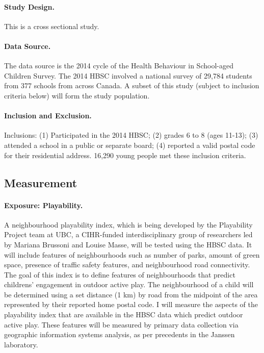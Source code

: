 \documentclass [11pt]{article}
\begin{document}
\paragraph{Study Design. }This is a cross sectional study. 

\paragraph{Data Source.} The data source is the 2014 cycle of the Health Behaviour in School-aged Children Survey. The 2014 HBSC involved a national survey of 29,784 students from 377 schools from across Canada. A subset of this study (subject to inclusion criteria below) will form the study population.  

\paragraph{Inclusion and Exclusion.} Inclusions:  (1) Participated in the 2014 HBSC; (2) grades 6 to 8 (ages 11-13); (3) attended a school in a public or separate board; (4) reported a valid postal code for their residential address.  16,290 young people met these inclusion criteria.

\subsection{Measurement} 

\paragraph{Exposure: Playability.} A neighbourhood playability index, which is being developed by the Playability Project team at UBC, a CIHR-funded interdisciplinary group of researchers led by Mariana Brussoni and Louise Masse, will be tested using the HBSC data. It will include features of neighbourhoods such as number of parks, amount of green space, presence of traffic safety features, and neighbourhood road connectivity. The goal of this index is to define features of neighbourhoods that predict childrens' engagement in outdoor active play. The neighbourhood of a child will be determined using a set distance (1 km) by road from the midpoint of the area represented by their reported home postal code. I will measure the aspects of the playability index that are available in the HBSC data which predict outdoor active play. These features will be measured by primary data collection via geographic information systems analysis, as per precedents in the Janssen laboratory.~\cite{Carson2014-xh} 
\end{document}
